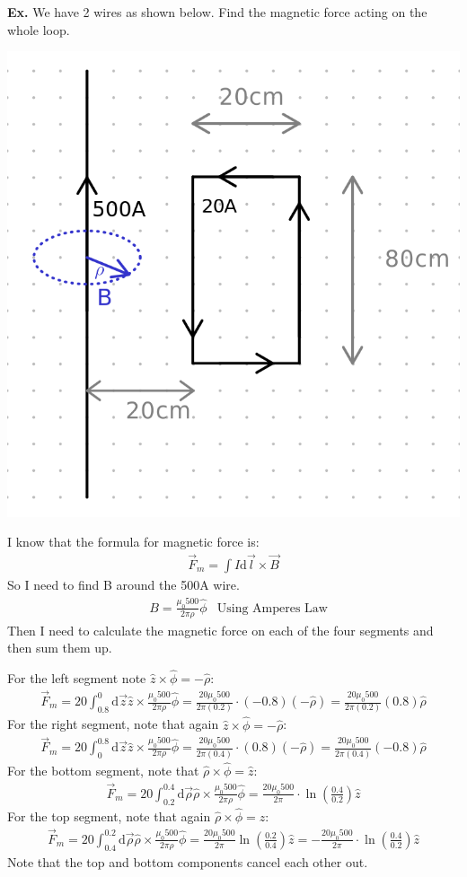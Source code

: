 \documentclass[12pt,letterpaper]{article} \usepackage{amsmath} \usepackage{graphicx} \usepackage[margin=1in]{geometry} \usepackage{longtable}  \usepackage{amssymb}
\begin{document}
	\begin{mdframed}
		\textbf{Ex. }We have 2 wires as shown below. Find the magnetic force acting on the whole loop.
		\begin{center}
			\includegraphics[width=0.4\linewidth]{"magnetic force-ex"}
		\end{center}
		I know that the formula for magnetic force is:
		\begin{align*}
			\vec F_m = \int I \mathrm d\vec l\times \vec B
		\end{align*}
		So I need to find B around the 500A wire. 
		\begin{align*}
			&B = \frac{\mu_0 500}{2\pi\rho}\hat\phi &\text{Using Amperes Law}
		\end{align*}
		Then I need to calculate the magnetic force on each of the four segments and then sum them up. 
		
		For the left segment note $\hat z \times \hat \phi = -\hat \rho$:
		\begin{align*}
			\vec F_m = 20\int_{0.8}^0 \mathrm d \vec z \hat z \times \frac{\mu_0 500}{2\pi\rho}\hat\phi	= \frac{20\mu_0 500}{2\pi(0.2)}\cdot (-0.8)(-\hat\rho) = \frac{20\mu_0 500}{2\pi(0.2)}(0.8)\hat \rho
		\end{align*}
		For the right segment, note that again $\hat z \times \hat \phi = -\hat \rho$:
		\begin{align*}
			\vec F_m = 20\int^{0.8}_0 \mathrm d \vec z \hat z \times \frac{\mu_0 500}{2\pi\rho}\hat\phi	= \frac{20\mu_0 500}{2\pi(0.4)}\cdot (0.8)(-\hat\rho) = \frac{20\mu_0 500}{2\pi(0.4)}(-0.8)\hat \rho
		\end{align*}
		For the bottom segment, note that $\hat \rho \times \hat \phi = \hat z$:
		\begin{align*}
			\vec F_m = 20\int^{0.4}_{0.2} \mathrm d \vec \rho \hat \rho \times \frac{\mu_0 500}{2\pi\rho}\hat\phi	= \frac{20\mu_0 500}{2\pi}\cdot \ln\left(\frac{0.4}{0.2}\right)\hat z
		\end{align*}
		For the top segment, note that again $\hat \rho \times \hat \phi = \hat z$:
		\begin{align*}
			\vec F_m = 20\int^{0.2}_{0.4} \mathrm d \vec \rho \hat \rho \times \frac{\mu_0 500}{2\pi\rho}\hat\phi	= \frac{20\mu_0 500}{2\pi} \ln\left(\frac{0.2}{0.4}\right)\hat z= -\frac{20\mu_0 500}{2\pi}\cdot \ln\left(\frac{0.4}{0.2}\right)\hat z
		\end{align*}
		Note that the top and bottom components cancel each other out. 
		

\end{mdframed}
\end{document}
